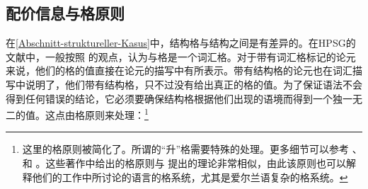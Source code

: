 \subsection{配价信息与格原则}

在\ref{Abschnitt-struktureller-Kasus}中，结构格与结构之间是有差异的。在HPSG的文献中，一般按照 \citet{Haider86}的观点，认为与格是一个词汇格。对于带有词汇格标记的论元来说，他们的格的值直接在论元的描写中有所表示。带有结构格的论元也在词汇描写中说明了，他们带有结构格，只不过没有给出真正的格的值。为了保证语法不会得到任何错误的结论，它必须要确保结构格根据他们出现的语境而得到一个独一无二的值。这点由格原则来处理：\footnote{%
这里的格原则被简化了。所谓的“升”格需要特殊的处理。更多细节可以参考 、 和 。这些著作中给出的格原则与 \citet*{YMJ87}提出的理论非常相似，由此该原则也可以解释他们的工作中所讨论的语言的格系统，尤其是爱尔兰语复杂的格系统。
}
